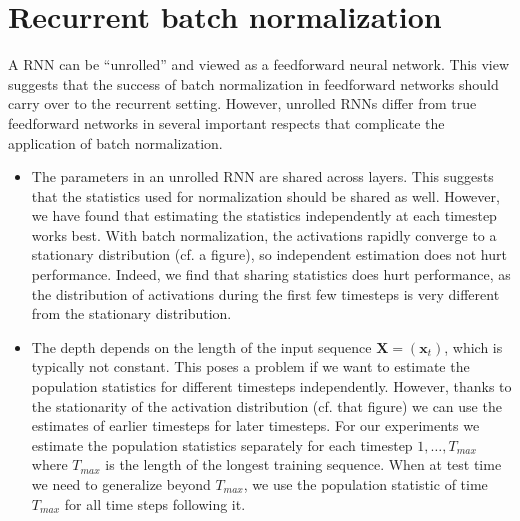 \documentclass{article} %
\newcommand{\vect}[1]{\mathbf{#1}}
\newcommand{\mat}[1]{\mathbf{#1}}
\begin{document}
\section{Recurrent batch normalization}
\label{sec:recurrent-batch-normalization}

A RNN can be ``unrolled'' and viewed as a feedforward neural network.
This view suggests that the success of batch normalization in feedforward networks should carry over to the recurrent setting.
However, unrolled RNNs differ from true feedforward networks in several important respects that complicate the application of batch normalization.

\begin{itemize}
\item
The parameters in an unrolled RNN are shared across layers.
This suggests that the statistics used for normalization should be shared as well.
However, we have found that estimating the statistics independently at each timestep works best.
With batch normalization, the activations rapidly converge to a stationary distribution (cf. a figure), so independent estimation does not hurt performance.
Indeed, we find that sharing statistics does hurt performance, as the distribution of activations during the first few timesteps is very different from the stationary distribution.
\\ \item
The depth depends on the length of the input sequence $\mat{X} = (\vect{x}_t)$, which is typically not constant.
This poses a problem if we want to estimate the population statistics for different timesteps independently.
However, thanks to the stationarity of the activation distribution (cf. that figure) we can use the estimates of earlier timesteps for later timesteps.
For our experiments we estimate the population statistics separately for each timestep $1, \ldots, T_{max}$ where $T_{max}$ is the length of the longest training sequence.
When at test time we need to generalize beyond $T_{max}$, we use the population statistic of time $T_{max}$ for all time steps following it.


\end{itemize}
\end{document}
